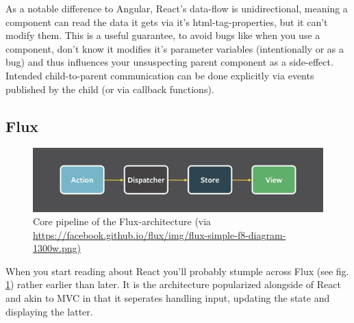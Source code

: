 As a notable difference to Angular, React's data-flow is unidirectional, meaning a component can read the data it gets via it's html-tag-properties, but it can't modify them. This is a useful guarantee, to avoid bugs like when you use a component, don't know it modifies it's parameter variables (intentionally or as a bug) and thus influences your unsuspecting parent component as a side-effect. Intended child-to-parent communication can be done explicitly via events published by the child (or via callback functions). 

\subsection{Flux}\label{ref:flux}

\begin{figure}
\centering
    \includegraphics[width=1.0\textwidth]{figures/flux_simple.png}
    \caption[Flux-pipe]{Core pipeline of the Flux-architecture (via \url{https://facebook.github.io/flux/img/flux-simple-f8-diagram-1300w.png)}}
\label{fig:flux_simple}
\end{figure}

When you start reading about React you'll probably stumple across Flux (see fig. \ref{fig:flux_simple}) rather earlier than later. It is the architecture popularized alongside of React and akin to MVC in that it seperates handling input, updating the state and displaying the latter.

